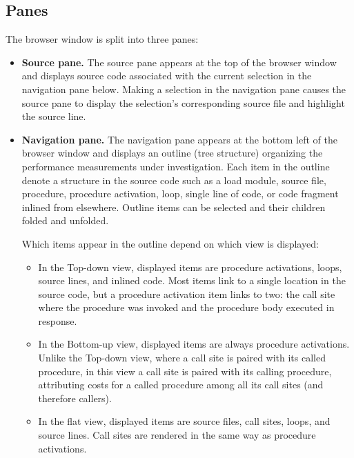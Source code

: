 \documentclass[english]{article}
\begin{document}
\subsection{Panes}

The browser window is split into three panes:

\begin{itemize}

\item \textbf{Source pane.} The source pane appears at the top of the browser window
and displays source code associated with the current selection in the navigation pane below.
Making a selection in the navigation pane causes the source pane
to display the selection's corresponding source file and highlight the source line.

\item \textbf{Navigation pane.}
The navigation pane appears at the bottom left of the browser window
and displays an outline (tree structure) organizing the performance measurements under investigation.
Each item in the outline denote a structure in the source code such as a
load module, source file, procedure, procedure activation,
loop, single line of code, or code fragment inlined from elsewhere.
Outline items can be selected and their children folded and unfolded.

Which items appear in the outline depend on which view is displayed: 

\begin{itemize}

\item In the Top-down view, displayed items are
procedure activations, loops, source lines, and inlined code. 
Most items link to a single location in the source code,
but a procedure activation item links to two:
the call site where the procedure was invoked and the procedure body executed in response.

\item In the Bottom-up view, displayed items are always procedure activations.
Unlike the Top-down view, where a call site is paired with its called procedure,
in this view a call site is paired with its calling procedure,
attributing costs for a called procedure among all its call sites (and therefore callers).

\item In the flat view, displayed items are
source files, call sites, loops, and source lines.
Call sites are rendered in the same way as procedure activations.

\end{itemize}


\end{itemize}
\end{document}
